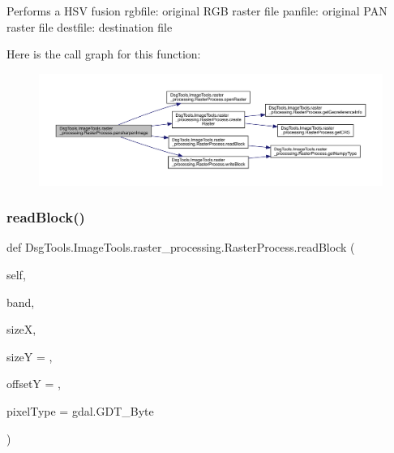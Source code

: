 \begin{DoxyVerb}Performs a HSV fusion
rgbfile: original RGB raster file
panfile: original PAN raster file
destfile: destination file
\end{DoxyVerb}
 Here is the call graph for this function\+:
\nopagebreak
\begin{figure}[H]
\begin{center}
\leavevmode
\includegraphics[width=350pt]{class_dsg_tools_1_1_image_tools_1_1raster__processing_1_1_raster_process_ab97bd21a7e0e90893917b02be37d8001_cgraph}
\end{center}
\end{figure}
\mbox{\label{class_dsg_tools_1_1_image_tools_1_1raster__processing_1_1_raster_process_a12d8f5cf2100deb19ccf59e86596648e}} 
\subsubsection{\texorpdfstring{read\+Block()}{readBlock()}}
{\footnotesize\ttfamily def Dsg\+Tools.\+Image\+Tools.\+raster\+\_\+processing.\+Raster\+Process.\+read\+Block (\begin{DoxyParamCaption}\item[{}]{self,  }\item[{}]{band,  }\item[{}]{sizeX,  }\item[{}]{sizeY = {},  }\item[{}]{offsetY = {},  }\item[{}]{pixel\+Type = {\ttfamily gdal.GDT\+\_\+Byte} }\end{DoxyParamCaption})}

